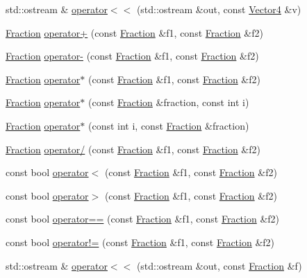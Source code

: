 \begin{DoxyCompactItemize}
\item 
std\+::ostream \& \hyperlink{namespaceprism_aeb86919d9ba71747d21fbd6e28671692}{operator$<$$<$} (std\+::ostream \&out, const \hyperlink{classprism_1_1_vector4}{Vector4} \&v)
\item 
\hyperlink{classprism_1_1_fraction}{Fraction} \hyperlink{namespaceprism_ac1b5b2765c314b2baa2dba5c57419829}{operator+} (const \hyperlink{classprism_1_1_fraction}{Fraction} \&f1, const \hyperlink{classprism_1_1_fraction}{Fraction} \&f2)
\item 
\hyperlink{classprism_1_1_fraction}{Fraction} \hyperlink{namespaceprism_a2daf470e5f35f8450447deb2634c22c1}{operator-\/} (const \hyperlink{classprism_1_1_fraction}{Fraction} \&f1, const \hyperlink{classprism_1_1_fraction}{Fraction} \&f2)
\item 
\hyperlink{classprism_1_1_fraction}{Fraction} \hyperlink{namespaceprism_ac4f48e3429a86bafcc7c21a2bd6a7ae1}{operator$\ast$} (const \hyperlink{classprism_1_1_fraction}{Fraction} \&f1, const \hyperlink{classprism_1_1_fraction}{Fraction} \&f2)
\item 
\hyperlink{classprism_1_1_fraction}{Fraction} \hyperlink{namespaceprism_a1f5007702b28b447f62c3b9df62f2aa4}{operator$\ast$} (const \hyperlink{classprism_1_1_fraction}{Fraction} \&fraction, const int i)
\item 
\hyperlink{classprism_1_1_fraction}{Fraction} \hyperlink{namespaceprism_af1ff5871f65565a84b886c5013bcd50a}{operator$\ast$} (const int i, const \hyperlink{classprism_1_1_fraction}{Fraction} \&fraction)
\item 
\hyperlink{classprism_1_1_fraction}{Fraction} \hyperlink{namespaceprism_a7ba7b5cc9750f0d6cda50f0cb874da6f}{operator/} (const \hyperlink{classprism_1_1_fraction}{Fraction} \&f1, const \hyperlink{classprism_1_1_fraction}{Fraction} \&f2)
\item 
const bool \hyperlink{namespaceprism_a105ac9995ade66ebb2a039ef90751c7a}{operator$<$} (const \hyperlink{classprism_1_1_fraction}{Fraction} \&f1, const \hyperlink{classprism_1_1_fraction}{Fraction} \&f2)
\item 
const bool \hyperlink{namespaceprism_a7122a7ff43fc6aba9cef9d31fe8c7559}{operator$>$} (const \hyperlink{classprism_1_1_fraction}{Fraction} \&f1, const \hyperlink{classprism_1_1_fraction}{Fraction} \&f2)
\item 
const bool \hyperlink{namespaceprism_a5b9e84008b9eaa99d29d4b74cd150cd8}{operator==} (const \hyperlink{classprism_1_1_fraction}{Fraction} \&f1, const \hyperlink{classprism_1_1_fraction}{Fraction} \&f2)
\item 
const bool \hyperlink{namespaceprism_aea72179b12983e614f72acd2b3cbf0e0}{operator!=} (const \hyperlink{classprism_1_1_fraction}{Fraction} \&f1, const \hyperlink{classprism_1_1_fraction}{Fraction} \&f2)
\item 
std\+::ostream \& \hyperlink{namespaceprism_a9c2d182a77a92e6cba7917dbd58f9d87}{operator$<$$<$} (std\+::ostream \&out, const \hyperlink{classprism_1_1_fraction}{Fraction} \&f)
\end{DoxyCompactItemize}


